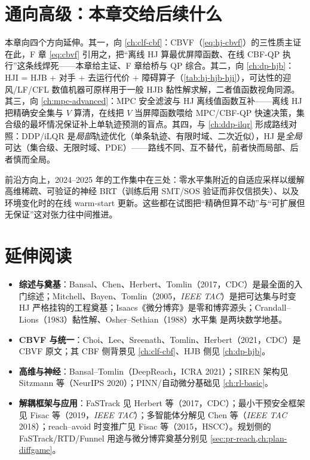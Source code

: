 \section*{通向高级：本章交给后续什么}

本章向四个方向延伸。其一，向 \cref{ch:clf-cbf}：CBVF（\cref{eq:hj-cbvf}）的三性质主证在此，F 章 \cref{eq:cbvf} 引用之，把“离线 HJ 算最优屏障函数、在线 CBF-QP 执行”这条线焊死——本章给主证、F 章给桥与 QP 综合。其二，向 \cref{ch:dp-hjb}：HJI = HJB + 对手 + 去运行代价 + 障碍算子（\cref{tab:hj-hjb-hji}），可达性的迎风/LF/CFL 数值机器可原样用于一般 HJB 黏性解求解，二者值函数视角同源。其三，向 \cref{ch:mpc-advanced}：MPC 安全滤波与 HJ 离线值函数互补——离线 HJ 把精确安全集与 $V$ 算清，在线把 $V$ 当屏障函数喂给 MPC/CBF-QP 快速决策，集合级的最坏情况保证补上单轨迹预测的盲点。其四，与 \cref{ch:ddp-ilqr} 形成路线对照：DDP/iLQR 是\emph{局部}轨迹优化（单条轨迹、有限时域、二次近似），HJ 是\emph{全局}可达（集合级、无限时域、PDE）——路线不同、互不替代，前者快而局部、后者慎而全局。

前沿方向上，2024--2025 年的工作集中在三处：零水平集附近的自适应采样以缓解高维稀疏、可验证的神经 BRT（训练后用 SMT/SOS 验证而非仅信损失）、以及环境变化时的在线 warm-start 更新。这些都在试图把“精确但算不动”与“可扩展但无保证”这对张力往中间推进。

\section*{延伸阅读}

\begin{itemize}
  \item \textbf{综述与奠基}：Bansal、Chen、Herbert、Tomlin（2017，CDC）是最全面的入门综述\cite{bansal2017hamilton}；Mitchell、Bayen、Tomlin（2005，\emph{IEEE TAC}）是把可达集与时变 HJ 严格挂钩的工程奠基\cite{mitchell2005time}；Isaacs《微分博弈》是零和博弈源头\cite{isaacs1965differential}；Crandall--Lions（1983）黏性解\cite{crandall1983viscosity}、Osher--Sethian（1988）水平集\cite{osher1988fronts} 是两块数学地基。
  \item \textbf{CBVF 与统一}：Choi、Lee、Sreenath、Tomlin、Herbert（2021，CDC）是 CBVF 原文\cite{choi2021cbvf}；其 CBF 侧背景见 \cref{ch:clf-cbf}、HJB 侧见 \cref{ch:dp-hjb}。
  \item \textbf{高维与神经}：Bansal--Tomlin（DeepReach，ICRA 2021）\cite{bansal2021deepreach}；SIREN 架构见 Sitzmann 等（NeurIPS 2020）\cite{sitzmann2020siren}；PINN/自动微分基础见 \cref{ch:rl-basic}。
  \item \textbf{解耦框架与应用}：FaSTrack 见 Herbert 等（2017，CDC）\cite{herbert2017fastrack}；最小干预安全框架见 Fisac 等（2019，\emph{IEEE TAC}）\cite{fisac2019general}；多智能体分解见 Chen 等（\emph{IEEE TAC} 2018）\cite{chen2018decomposition}；reach--avoid 时变推广见 Fisac 等（2015，HSCC）\cite{fisac2015reach}。规划侧的 FaSTrack/RTD/Funnel 用途与微分博弈奠基分别见 \cref{sec:pr-reach,ch:plan-diffgame}。
\end{itemize}
